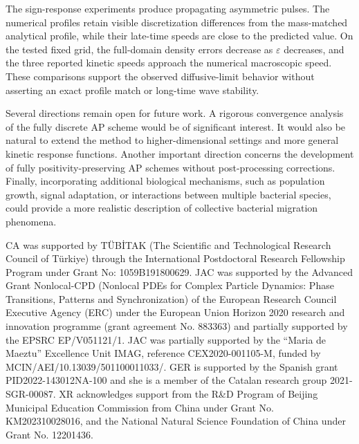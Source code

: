\documentclass[11pt,twoside]{article}
\numberwithin{equation}{section}
\theoremstyle{plain}
\theoremstyle{nonumberplain}
\newenvironment{resultrevision}{\par\begingroup\color{red}}{\par\endgroup}
\begin{document}
\begin{resultrevision}
The sign-response experiments produce propagating asymmetric pulses.
The numerical profiles retain visible discretization differences from
the mass-matched analytical profile, while their late-time speeds are
close to the predicted value. On the tested fixed grid, the full-domain
density errors decrease as $\varepsilon$ decreases, and the three
reported kinetic speeds approach the numerical macroscopic speed.
These comparisons support the observed diffusive-limit behavior
without asserting an exact profile match or long-time wave stability.
\end{resultrevision}

Several directions remain open for future work. A rigorous convergence analysis of the fully discrete AP scheme would be of significant interest. It would also be natural to extend the method to higher-dimensional settings and more general kinetic response functions. Another important direction concerns the development of fully positivity-preserving AP schemes without post-processing corrections. Finally, incorporating additional biological mechanisms, such as population growth, signal adaptation, or interactions between multiple bacterial species, could provide a more realistic description of collective bacterial migration phenomena.



\bigskip
{} 
CA was supported by TÜBİTAK (The Scientific and Technological Research Council of Türkiye) through the International Postdoctoral Research Fellowship Program under Grant No: 1059B191800629.
JAC was supported by the Advanced Grant Nonlocal-CPD (Nonlocal PDEs for Complex Particle Dynamics: Phase Transitions, Patterns and Synchronization) of the European Research Council Executive Agency (ERC) under the European Union Horizon 2020 research and innovation programme (grant agreement No. 883363) and  partially supported by the EPSRC EP/V051121/1. JAC was partially supported by the ``Maria de Maeztu'' Excellence Unit IMAG, reference CEX2020-001105-M, funded by MCIN/AEI/10.13039/501100011033/.
GER is supported by the Spanish grant PID2022-143012NA-100 and she is a member of the Catalan research group 2021-SGR-00087.
XR acknowledges support from the R\&D Program of Beijing Municipal Education Commission from China under Grant No.  KM202310028016, and the National Natural Science Foundation of China under Grant No. 12201436. 
\end{document}
